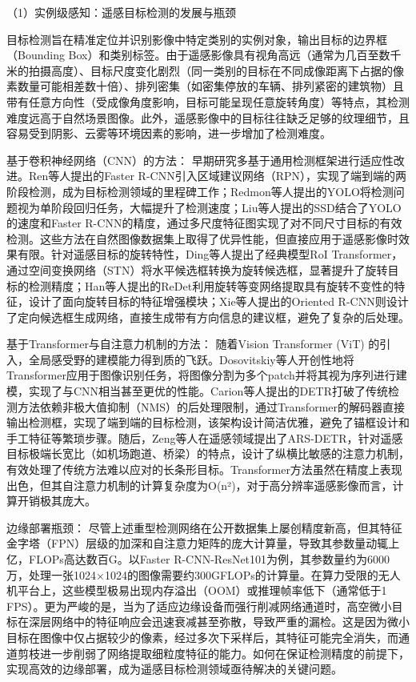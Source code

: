 （1）实例级感知：遥感目标检测的发展与瓶颈

目标检测旨在精准定位并识别影像中特定类别的实例对象，输出目标的边界框（Bounding Box）和类别标签。由于遥感影像具有视角高远（通常为几百至数千米的拍摄高度）、目标尺度变化剧烈（同一类别的目标在不同成像距离下占据的像素数量可能相差数十倍）、排列密集（如密集停放的车辆、排列紧密的建筑物）且带有任意方向性（受成像角度影响，目标可能呈现任意旋转角度）等特点，其检测难度远高于自然场景图像。此外，遥感影像中的目标往往缺乏足够的纹理细节，且容易受到阴影、云雾等环境因素的影响，进一步增加了检测难度。

基于卷积神经网络（CNN）的方法： 早期研究多基于通用检测框架进行适应性改进。Ren等人提出的Faster R-CNN\cite{ren2015faster}引入区域建议网络（RPN），实现了端到端的两阶段检测，成为目标检测领域的里程碑工作；Redmon等人提出的YOLO\cite{redmon2016yolo}将检测问题视为单阶段回归任务，大幅提升了检测速度；Liu等人提出的SSD\cite{liu2016ssd}结合了YOLO的速度和Faster R-CNN的精度，通过多尺度特征图实现了对不同尺寸目标的有效检测。这些方法在自然图像数据集上取得了优异性能，但直接应用于遥感影像时效果有限。针对遥感目标的旋转特性，Ding等人提出了经典模型RoI Transformer\cite{ding2019learning}，通过空间变换网络（STN）将水平候选框转换为旋转候选框，显著提升了旋转目标的检测精度；Han等人提出的ReDet\cite{han2021redet}利用旋转等变网络提取具有旋转不变性的特征，设计了面向旋转目标的特征增强模块；Xie等人提出的Oriented R-CNN\cite{xie2021oriented}则设计了定向候选框生成网络，直接生成带有方向信息的建议框，避免了复杂的后处理。

基于Transformer与自注意力机制的方法： 随着Vision Transformer (ViT) 的引入，全局感受野的建模能力得到质的飞跃。Dosovitskiy等人开创性地将Transformer应用于图像识别任务，将图像分割为多个patch并将其视为序列进行建模，实现了与CNN相当甚至更优的性能。Carion等人提出的DETR\cite{carion2020end}打破了传统检测方法依赖非极大值抑制（NMS）的后处理限制，通过Transformer的解码器直接输出检测框，实现了端到端的目标检测，该架构设计简洁优雅，避免了锚框设计和手工特征等繁琐步骤。随后，Zeng等人在遥感领域提出了ARS-DETR\cite{zeng2024ars}，针对遥感目标极端长宽比（如机场跑道、桥梁）的特点，设计了纵横比敏感的注意力机制，有效处理了传统方法难以应对的长条形目标。Transformer方法虽然在精度上表现出色，但其自注意力机制的计算复杂度为O(n²)，对于高分辨率遥感影像而言，计算开销极其庞大。

边缘部署瓶颈： 尽管上述重型检测网络在公开数据集上屡创精度新高，但其特征金字塔（FPN）层级的加深和自注意力矩阵的庞大计算量，导致其参数量动辄上亿，FLOPs高达数百G。以Faster R-CNN-ResNet101为例，其参数量约为6000万，处理一张1024×1024的图像需要约300GFLOPs的计算量。在算力受限的无人机平台上，这些模型极易出现内存溢出（OOM）或推理帧率低下（通常低于1 FPS）。更为严峻的是，当为了适应边缘设备而强行削减网络通道时，高空微小目标在深层网络中的特征响应会迅速衰减甚至弥散，导致严重的漏检。这是因为微小目标在图像中仅占据较少的像素，经过多次下采样后，其特征可能完全消失，而通道剪枝进一步削弱了网络提取细粒度特征的能力。如何在保证检测精度的前提下，实现高效的边缘部署，成为遥感目标检测领域亟待解决的关键问题。

